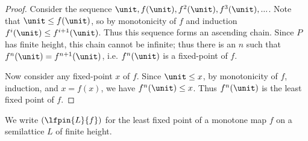 \begin{proof}
  Consider the sequence $\unit, f(\unit), f^2(\unit), f^3(\unit), ...$. Note that
  $\unit \le f(\unit)$, so by monotonicity of $f$ and induction $f^i(\unit) \le
  f^{i+1}(\unit)$. Thus this sequence forms an ascending chain. Since $P$ has
  finite height, this chain cannot be infinite; thus there is an $n$ such that
  $f^n(\unit) = f^{n+1}(\unit)$, i.e. $f^n(\unit)$ is a fixed-point of $f$.

  Now consider any fixed-point $x$ of $f$. Since $\unit \le x$, by monotonicity of
  $f$, induction, and $x = f(x)$, we have $f^n(\unit) \le x$. Thus $f^n(\unit)$ is
  the least fixed point of $f$.
\end{proof}

We write $(\lfpin{L}{f})$ for the least fixed point of a monotone map $f$ on a
semilattice $L$ of finite height.



